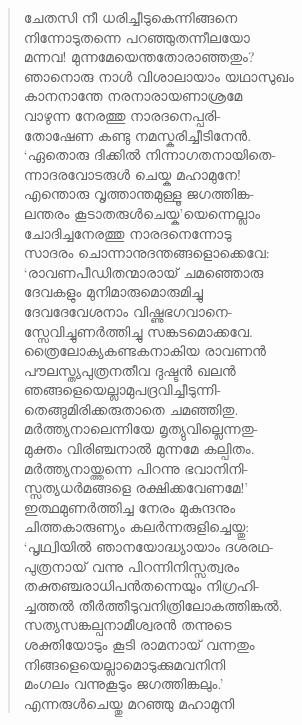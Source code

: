 \begin{verse}
ചേതസി നീ ധരിച്ചീടുകെന്നിങ്ങനെ\\
നിന്നോടുതന്നെ പറഞ്ഞുതന്നീലയോ\\
മന്നവ! മുന്നമേയെന്തതോരാഞ്ഞതും?\\
ഞാനൊരു നാള്‍ വിശാലായാം യഥാസുഖം\\
കാനനാന്തേ നരനാരായണാശ്രമേ\\
വാഴുന്ന നേരത്തു നാരദനെപ്പരി-\\
തോഷേണ കണ്ടു നമസ്കരിച്ചീടിനേന്‍.\\
‘ഏതൊരു ദിക്കില്‍ നിന്നാഗതനായിതെ-\\
ന്നാദരവോടരുള്‍ ചെയ്ക മഹാമുനേ!\\
എന്തൊരു വൃത്താന്തമുള്ളൂ ജഗത്തിങ്ക-\\
ലന്തരം കൂടാതരുള്‍ചെയ്ക’യെന്നെല്ലാം\\
ചോദിച്ചനേരത്തു നാരദനെന്നോടു\\
സാദരം ചൊന്നാനുദന്തങ്ങളൊക്കെവേ:\\
‘രാവണപീഡിതന്മാരായ് ചമഞ്ഞൊരു\\
ദേവകളും മുനിമാരുമൊരുമിച്ചു\\
ദേവദേവേശനാം വിഷ്ണുഭഗവാനെ-\\
സ്സേവിച്ചുണര്‍ത്തിച്ചു സങ്കടമൊക്കവേ.\\
ത്രൈലോക്യകണ്ടകനാകിയ രാവണന്‍\\
പൗലസ്ത്യപുത്രനതീവ ദുഷ്ടന്‍ ഖലന്‍\\
ഞങ്ങളെയെല്ലാമുപദ്രവിച്ചീടുന്നി-\\
തെങ്ങുമിരിക്കരുതാതെ ചമഞ്ഞിതു.\\
മര്‍ത്ത്യനാലെന്നിയേ മൃത്യുവില്ലെന്നതു-\\
മുക്തം വിരിഞ്ചനാല്‍ മുന്നമേ കല്പിതം.\\
മര്‍ത്ത്യനായ്ത്തന്നെ പിറന്നു ഭവാനിനി-\\
സ്സത്യധര്‍മങ്ങളെ രക്ഷിക്കവേണമേ!’\\
ഇത്ഥമുണര്‍ത്തിച്ച നേരം മുകുന്ദനും\\
ചിത്തകാരുണ്യം കലര്‍ന്നരുളിച്ചെയ്തു:\\
‘പൃഥ്വിയില്‍ ഞാനയോദ്ധ്യായാം ദശരഥ-\\
പുത്രനായ് വന്നു പിറന്നിനിസ്സത്വരം\\
തക്തഞ്ചരാധിപന്‍തന്നെയും നിഗ്രഹി-\\
ച്ചത്തല്‍ തീര്‍ത്തീടുവനിത്രിലോകത്തിങ്കല്‍.\\
സത്യസങ്കല്പനാമീശ്വരന്‍ തന്നുടെ\\
ശക്തിയോടും കൂടി രാമനായ് വന്നതും\\
നിങ്ങളെയെല്ലാമൊടുക്കുമവനിനി\\
മംഗലം വന്നുകൂടും ജഗത്തിങ്കലും.’\\
എന്നരുള്‍ചെയ്തു മറഞ്ഞു മഹാമുനി\\

\end{verse}
